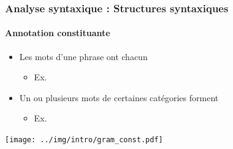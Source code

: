 \documentclass[xcolor=table]{beamer}
\begin{document}
\begin{frame}
\frametitle{Analyse syntaxique : Structures syntaxiques}
\framesubtitle{Annotation constituante}

\begin{itemize}
	\item Les mots d'une phrase ont chacun 
	\begin{itemize}
		\item Ex. 
	\end{itemize}
	\item Un ou plusieurs mots de certaines catégories forment 
	\begin{itemize}
		\item Ex. 
	\end{itemize}
\end{itemize}

\begin{center}
	\texttt{[image: ../img/intro/gram\_const.pdf]}
\end{center}

\end{frame}
\end{document}

